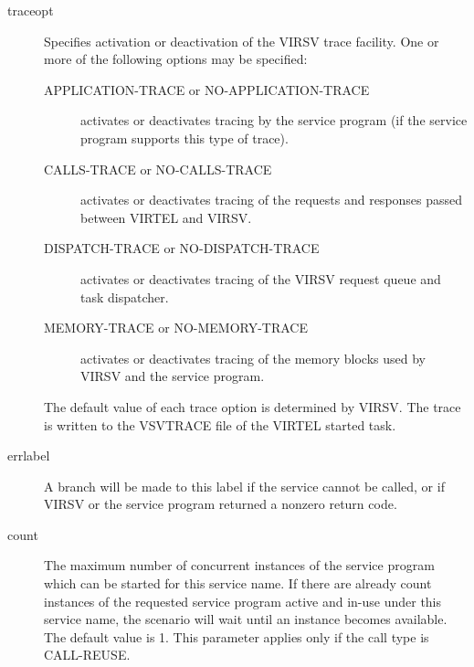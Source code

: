 \documentclass[letterpaper,10pt,english]{sphinxmanual}
\begin{document}
\begin{description}
\item[{traceopt}] \leavevmode
Specifies activation or deactivation of the VIRSV trace facility. One or more of the following options may be specified:
\begin{description}
\item[{APPLICATION-TRACE or NO-APPLICATION-TRACE}] \leavevmode
activates or deactivates tracing by the service program (if the service program supports this type of trace).

\item[{CALLS-TRACE or NO-CALLS-TRACE}] \leavevmode
activates or deactivates tracing of the requests and responses passed between VIRTEL and VIRSV.

\item[{DISPATCH-TRACE or NO-DISPATCH-TRACE}] \leavevmode
activates or deactivates tracing of the VIRSV request queue and task dispatcher.

\item[{MEMORY-TRACE or NO-MEMORY-TRACE}] \leavevmode
activates or deactivates tracing of the memory blocks used by VIRSV and the service program.

\end{description}

The default value of each trace option is determined by VIRSV. The trace is written to the VSVTRACE file of the VIRTEL started task.

\item[{errlabel}] \leavevmode
A branch will be made to this label if the service cannot be called, or if VIRSV or the service program returned a nonzero return code.

\item[{count}] \leavevmode
The maximum number of concurrent instances of the service program which can be started for this service name. If there are already count instances of the requested service program active and in-use under this service name, the scenario will wait until an instance becomes available. The default value is 1. This parameter applies only if the call type is CALL-REUSE.

\end{description}
\end{document}
